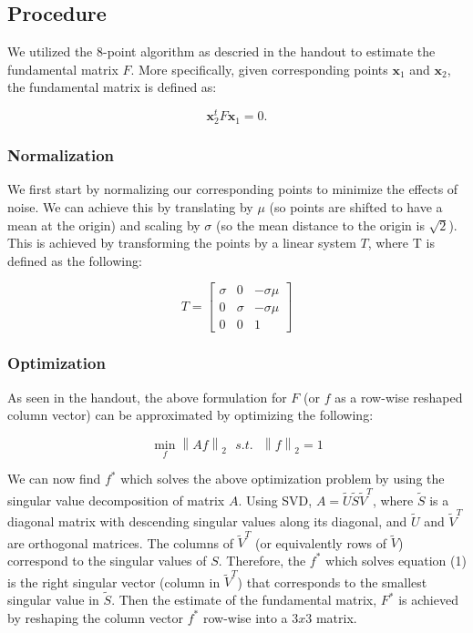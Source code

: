 \subsection{Procedure}
We utilized the 8-point algorithm as descried in the handout to estimate the fundamental matrix $F$. More specifically, given corresponding points $\textbf{x}_{1}$ and $\textbf{x}_{2}$, the fundamental matrix is defined as:

$$
\textbf{x}_{2}^{t} F \textbf{x}_{1} = 0.
$$

\subsubsection{Normalization} 
We first start by normalizing our corresponding points to minimize the effects of noise. We can achieve this by translating by $\mu$ (so points are shifted to have a mean at the origin) and scaling by $\sigma$ (so the mean distance to the origin is $\sqrt{2}$). This is achieved by transforming the points by a linear system $T$, where T is defined as the following:

$$
T =
\begin{bmatrix}
\sigma & 0 & -\sigma \mu \\
0 & \sigma & -\sigma \mu \\
0 & 0 & 1
\end{bmatrix}
$$

\subsubsection{Optimization}

\noindent As seen in the handout, the above formulation for $F$ (or $f$ as a row-wise reshaped column vector) can be approximated by optimizing the following:

\begin{equation}
\min_{f} \left\|Af\right\|_{2} \ \ \ s.t. \ \ \  \left\|f\right\|_{2} = 1
\end{equation}

\noindent We can now find $f^{*}$ which solves the above optimization problem by using the singular value decomposition of matrix $A$. Using SVD, $A = \tilde{U}\tilde{S}\tilde{V}^{T}$, where $\tilde{S}$ is a diagonal matrix with descending singular values along its diagonal, and $\tilde{U}$ and $\tilde{V}^{T}$ are orthogonal matrices. The columns of $\tilde{V}^{T}$ (or equivalently rows of $\tilde{V}$) correspond to the singular values of $S$. Therefore, the $f^{*}$ which solves equation (1) is the right singular vector (column in $\tilde{V}^{T}$) that corresponds to the smallest singular value in $\tilde{S}$. Then the estimate of the fundamental matrix, $F^{*}$ is achieved by reshaping the column vector $f^{*}$ row-wise into a $3x3$ matrix. \\

